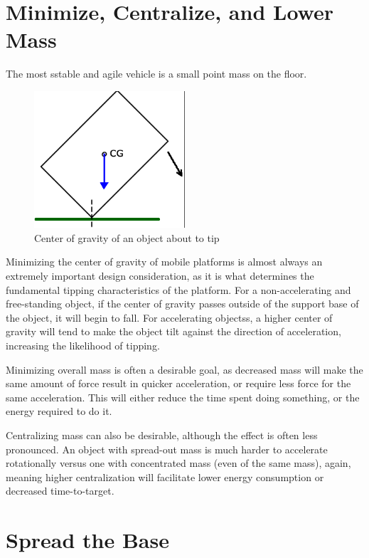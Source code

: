 \section{Minimize, Centralize, and Lower Mass}

\begin{theorem} \label{theorem:lower_mass}
	The most sstable and agile vehicle is a small point mass on the floor.
\end{theorem}

\begin{figure}
	\includegraphics[width=0.5\textwidth]{imgs/cg_explanation.png}
	\caption{Center of gravity of an object about to tip}
\end{figure}

Minimizing the center of gravity of mobile platforms is almost always an extremely important design consideration, as it is what determines the fundamental tipping characteristics of the platform. For a non-accelerating and free-standing object, if the center of gravity passes outside of the support base of the object, it will begin to fall. For accelerating objectss, a higher center of gravity will tend to make the object tilt against the direction of acceleration, increasing the likelihood of tipping.

Minimizing overall mass is often a desirable goal, as decreased mass will make the same amount of force result in quicker acceleration, or require less force for the same acceleration. This will either reduce the time spent doing something, or the energy required to do it.

Centralizing mass can also be desirable, although the effect is often less pronounced. An object with spread-out mass is much harder to accelerate rotationally versus one with concentrated mass (even of the same mass), again, meaning higher centralization will facilitate lower energy consumption or decreased time-to-target.

\section{Spread the Base}

